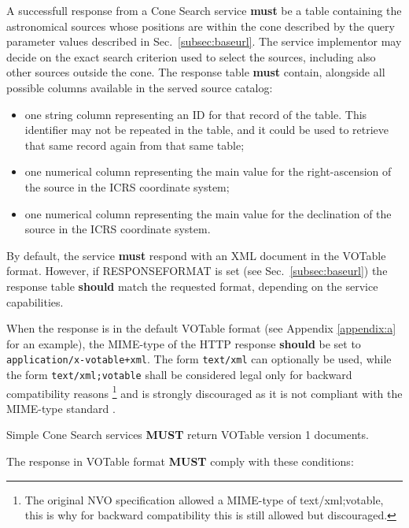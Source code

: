 \documentclass[11pt,a4paper]{ivoa}
\begin{document}
A successfull response from a Cone Search service \textbf{must} be a
table containing the astronomical sources whose positions are within the
cone described by the query parameter values described in
Sec.~\ref{subsec:baseurl}. The service implementor may decide on the exact
search criterion used to select the sources, including also other
sources outside the cone.
The response table \textbf{must} contain, alongside all possible columns
available in the served source catalog:
\begin{itemize}
	\item one string column representing an ID for that record of the table.
		This identifier may not be repeated in the table, and it could be used to
		retrieve that same record again from that same table;
	\item one numerical column representing the main value for the
		right-ascension of the source in the ICRS coordinate system;
	\item one numerical column representing the main value for the
		declination of the source in the ICRS coordinate system.
\end{itemize}

By default, the service \textbf{must} respond with an XML document in the
VOTable\citep{2025ivoa.spec.0116O} format. However, if RESPONSEFORMAT is
set (see Sec.~\ref{subsec:baseurl}) the response table \textbf{should}
match the requested format, depending on the service capabilities.

When the response is in the default VOTable format (see Appendix \ref{appendix:a}
for an example), the MIME-type of the HTTP response \textbf{should} be
set to \texttt{application/x-votable+xml}. The form
\texttt{text/xml} can optionally be used, while the
form \texttt{text/xml;votable} shall be considered legal
only for backward compatibility reasons
\footnote{
	The original NVO specification allowed a MIME-type of text/xml;votable,
	this is why for backward compatibility this is still allowed but discouraged.
}
and is strongly discouraged as it is not compliant with the MIME-type
standard \citep{std:MIME}. 

Simple Cone Search services \textbf{MUST} return VOTable
version 1 documents.

The response in VOTable format \textbf{MUST} comply with these conditions:
\end{document}
